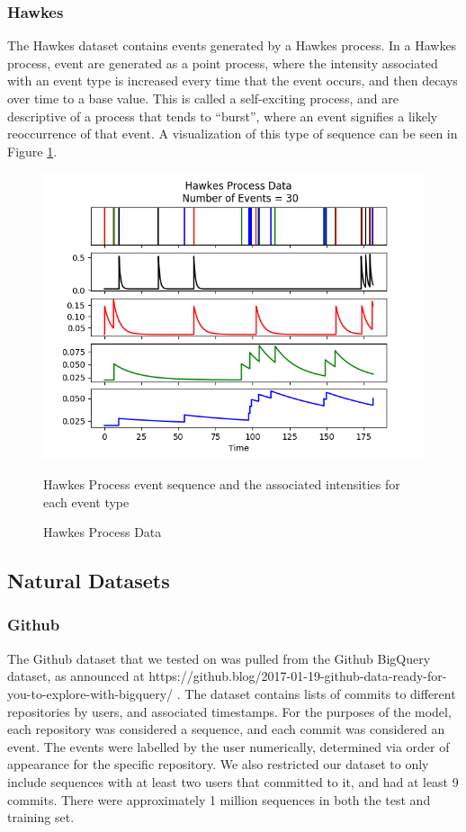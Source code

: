 \subsubsection{Hawkes}
The Hawkes dataset contains events generated by a Hawkes process. In a Hawkes process, event are generated as a point process, where the intensity associated with an event type is increased every time that the event occurs, and then decays over time to a base value. This is called a self-exciting process, and are descriptive of a process that tends to ``burst'', where an event signifies a likely reoccurrence of that event. A visualization of this type of sequence can be seen in Figure \ref{fig:Hawkes}.
\begin{figure}
    \centering
    \includegraphics{figures/hawkes630.png}
    \caption{Hawkes Process Data}
    \label{fig:Hawkes}
    Hawkes Process event sequence and the  associated intensities for each event type
\end{figure}
\subsection{Natural Datasets}
\subsubsection{Github}
The Github dataset that we tested on was pulled from the Github BigQuery dataset, as announced at https://github.blog/2017-01-19-github-data-ready-for-you-to-explore-with-bigquery/ \cite{Github}. The dataset contains lists of commits to different repositories by users, and associated timestamps. For the purposes of the model, each repository was considered a sequence, and each commit was considered an event. The events were labelled by the user numerically, determined via order of appearance for the specific repository. We also restricted our dataset to only include sequences with at least two users that committed to it, and had at least 9 commits. There were approximately 1 million sequences in both the test and training set.

